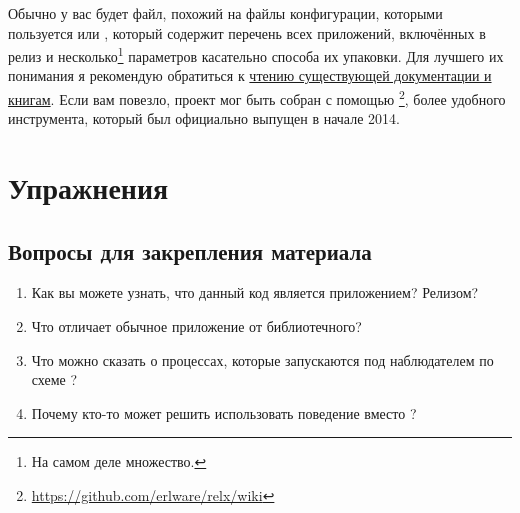 \documentclass[11pt, oneside]{book}   	%
\newcommand{\ReviewTitle}{Вопросы для закрепления материала}
\begin{document}
Обычно у вас будет файл, похожий на файлы конфигурации, которыми пользуется   или , который содержит перечень всех приложений, включённых в релиз и несколько\footnote{На самом деле множество.} параметров касательно способа их упаковки. Для лучшего их понимания я рекомендую обратиться к  \href{http://learnyousomeerlang.com/release-is-the-word}{чтению существующей документации и книгам}. Если вам повезло, проект мог быть собран с помощью \footnote{\href{https://github.com/erlware/relx/wiki}{https://github.com/erlware/relx/wiki}}, более удобного инструмента, который был официально выпущен в начале 2014.


\section{Упражнения}

\subsection*{\ReviewTitle{}}

\begin{enumerate}
	\item Как вы можете узнать, что данный код является приложением? Релизом?
	\item Что отличает обычное приложение от библиотечного?
	\item Что можно сказать о процессах, которые запускаются под наблюдателем по схеме ?
	\item Почему кто-то может решить использовать поведение  вместо ?
\end{enumerate}
\end{document}
